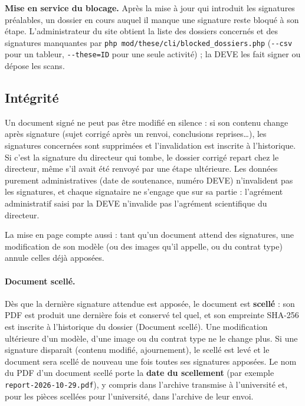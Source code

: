 \documentclass[11pt,a4paper]{article}
\begin{document}
\begin{astuce}
\textbf{Mise en service du blocage.} Après la mise à jour qui introduit les
signatures préalables, un dossier en cours auquel il manque une signature reste
bloqué à son étape. L'administrateur du site obtient la liste des dossiers
concernés et des signatures manquantes par
\texttt{php mod/these/cli/blocked\_dossiers.php} (\texttt{-{}-csv} pour un
tableur, \texttt{-{}-these=ID} pour une seule activité) ; la DEVE les fait signer
ou dépose les scans.
\end{astuce}

\subsection{Intégrité}\label{sec:integrite}

Un document signé ne peut pas être modifié en silence : si son contenu change
après signature (sujet corrigé après un renvoi, conclusions reprises\ldots), les
signatures concernées sont supprimées et l'invalidation est inscrite à
l'historique. Si c'est la signature du directeur qui tombe, le dossier corrigé
repart chez le directeur, même s'il avait été renvoyé par une étape ultérieure.
Les données purement administratives (date de soutenance, numéro DEVE)
n'invalident pas les signatures, et chaque signataire ne s'engage que sur sa
partie : l'agrément administratif saisi par la DEVE n'invalide pas l'agrément
scientifique du directeur.

La mise en page compte aussi : tant qu'un document attend des signatures, une
modification de son modèle (ou des images qu'il appelle, ou du contrat type)
annule celles déjà apposées.

\paragraph{Document scellé.} Dès que la dernière signature attendue est
apposée, le document est \textbf{scellé} : son PDF est produit une dernière fois
et conservé tel quel, et son empreinte SHA-256 est inscrite à l'historique du
dossier (\og Document scellé\fg{}). Une modification ultérieure d'un modèle,
d'une image ou du contrat type ne le change plus. Si une signature disparaît
(contenu modifié, ajournement), le scellé est levé et le document sera scellé de
nouveau une fois toutes ses signatures apposées. Le nom du PDF d'un document
scellé porte la \textbf{date du scellement} (par exemple
\texttt{report-2026-10-29.pdf}), y compris dans l'archive transmise à
l'université et, pour les pièces scellées pour l'université, dans l'archive de
leur envoi.
\end{document}
